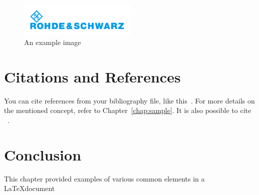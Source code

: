 \begin{figure}[h]
    \centering
    \includegraphics[width=0.5\textwidth]{figures/logos/X_logo_RS.pdf}
    \caption{An example image}
    \label{fig:example}
\end{figure}

\section{Citations and References}
You can cite references from your bibliography file, like this~\cite{sampleArticle}. For more details on the mentioned concept, refer to Chapter~\ref{chap:sample}.
It is also possible to cite \citeauthor{sampleArticle}~\citeyear{sampleArticle}.

\section{Conclusion}
This chapter provided examples of various common elements in a \LaTeX document